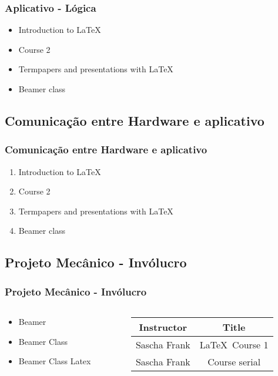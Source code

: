 \documentclass[hyperref={pdfpagelabels=false}]{beamer}
\begin{document}
            \begin{frame}\frametitle{Aplicativo - Lógica}
            \begin{itemize}
            \item Introduction to  \LaTeX \pause
            \item Course 2 \pause
            \item Termpapers and presentations with \LaTeX \pause
            \item Beamer class
            \end{itemize}
            \end{frame}

            \subsection{Comunicação entre Hardware e aplicativo}

            \begin{frame}\frametitle{Comunicação entre Hardware e aplicativo}
            \begin{enumerate}
            \item Introduction to  \LaTeX
            \item Course 2
            \item Termpapers and presentations with \LaTeX
            \item Beamer class
            \end{enumerate}
            \end{frame}

            \subsection{Projeto Mecânico - Invólucro}

            \begin{frame}\frametitle{Projeto Mecânico - Invólucro}
            \begin{columns}
            \begin{column}{5cm}
            \begin{itemize}
            \item Beamer
            \item Beamer Class
            \item Beamer Class Latex
            \end{itemize}
            \end{column}
            \begin{column}{5cm}
            \begin{tabular}{|c|c|}
            \hline
            \textbf{Instructor} & \textbf{Title} \\
            \hline
            Sascha Frank &  \LaTeX \ Course 1 \\
            \hline
            Sascha Frank &  Course serial  \\
            \hline
            \end{tabular}
            \end{column}
            \end{columns}
            \end{frame}
\end{document}
